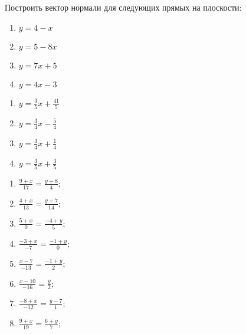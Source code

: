 	\vspace{15pt}
	Построить вектор нормали для следующих прямых на плоскости:

	\begin{multicols}{2}
		\begin{enumerate}
			\setcounter{enumi}{\value{tasks}}

				\item \( \displaystyle y = 4 - x \)
				\item \( \displaystyle y = 5 - 8x \)
				\item \( \displaystyle y = 7x + 5 \)
				\item \( \displaystyle y = 4x - 3 \)

			\setcounter{tasks}{\value{enumi}}
		\end{enumerate}
	\end{multicols}

	\vspace{10pt}
	\begin{multicols}{2}
		\begin{enumerate}
			\setcounter{enumi}{\value{tasks}}

				\item \( \displaystyle y = \frac{3}{5} x + \frac{41}{5} \)
				\item \( \displaystyle y = \frac{3}{4} x - \frac{5}{4} \)
				\item \( \displaystyle y = \frac{3}{4} x + \frac{1}{4} \)
				\item \( \displaystyle y = \frac{3}{5} x + \frac{3}{5} \)

			\setcounter{tasks}{\value{enumi}}
		\end{enumerate}
	\end{multicols}

	\vspace{10pt}
	\begin{multicols}{2}
		\begin{enumerate}
			\setcounter{enumi}{\value{tasks}}

				\item \( \displaystyle \frac{9+x}{17} = \frac{y+8}{4} \);
				\item \( \displaystyle \frac{4+x}{13} = \frac{y+7}{14} \);
				\item \( \displaystyle \frac{5+x}{0} = \frac{-4+y}{5} \);
				\item \( \displaystyle \frac{-3+x}{-7} = \frac{-1+y}{0} \);
				\item \( \displaystyle \frac{x-7}{-13} = \frac{-1+y}{2} \);
				\item \( \displaystyle \frac{x-10}{-16} = \frac{y}{2} \);
				\item \( \displaystyle \frac{-8+x}{-12} = \frac{y-7}{1} \);
				\item \( \displaystyle \frac{9+x}{19} = \frac{6+y}{7} \);

			\setcounter{tasks}{\value{enumi}}
		\end{enumerate}
	\end{multicols}


